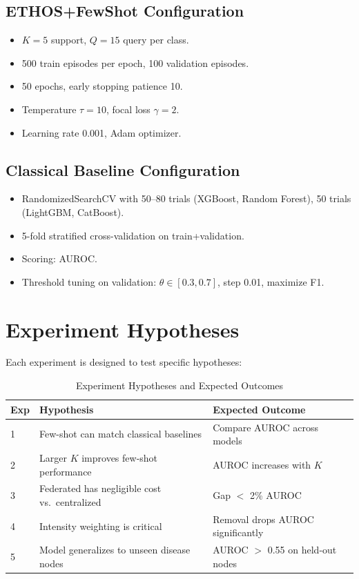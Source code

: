 \subsection{ETHOS+FewShot Configuration}

\begin{itemize}
\item $K = 5$ support, $Q = 15$ query per class.
\item 500 train episodes per epoch, 100 validation episodes.
\item 50 epochs, early stopping patience 10.
\item Temperature $\tau = 10$, focal loss $\gamma = 2$.
\item Learning rate 0.001, Adam optimizer.
\end{itemize}

\subsection{Classical Baseline Configuration}

\begin{itemize}
\item RandomizedSearchCV with 50--80 trials (XGBoost, Random Forest), 50 trials (LightGBM, CatBoost).
\item 5-fold stratified cross-validation on train+validation.
\item Scoring: AUROC.
\item Threshold tuning on validation: $\theta \in [0.3, 0.7]$, step 0.01, maximize F1.
\end{itemize}

\section{Experiment Hypotheses}

Each experiment is designed to test specific hypotheses:

\begin{table}[htbp]
\centering
\caption{Experiment Hypotheses and Expected Outcomes}
\small
\begin{tabular}{p{1.5cm}p{4cm}p{4cm}}
\toprule
\textbf{Exp} & \textbf{Hypothesis} & \textbf{Expected Outcome} \\
\midrule
1 & Few-shot can match classical baselines & Compare AUROC across models \\
2 & Larger $K$ improves few-shot performance & AUROC increases with $K$ \\
3 & Federated has negligible cost vs.\ centralized & Gap $<$ 2\% AUROC \\
4 & Intensity weighting is critical & Removal drops AUROC significantly \\
5 & Model generalizes to unseen disease nodes & AUROC $>$ 0.55 on held-out nodes \\
\bottomrule
\end{tabular}
\label{tab:exp_hypotheses}
\end{table}

